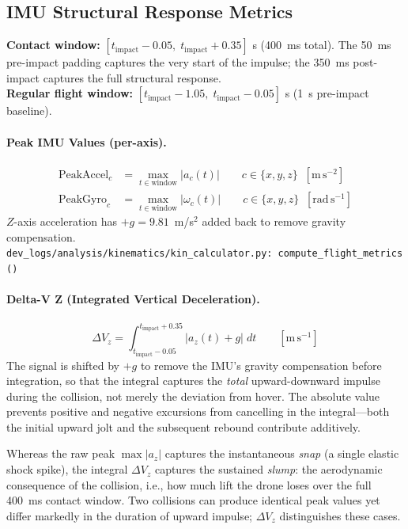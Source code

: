 \subsection{IMU Structural Response Metrics}

\textbf{Contact window:} $[t_{\text{impact}} - 0.05,\; t_{\text{impact}} + 0.35]$ s (400~ms total). The 50~ms pre-impact padding captures the very start of the impulse; the 350~ms post-impact captures the full structural response.\\
\textbf{Regular flight window:} $[t_{\text{impact}} - 1.05,\; t_{\text{impact}} - 0.05]$ s (1~s pre-impact baseline).

\medskip
\paragraph{Peak IMU Values (per-axis).}
\begin{align}
    \mathrm{PeakAccel}_c &= \max_{t \in \text{window}} |a_c(t)| \qquad c \in \{x, y, z\} \;\;[\mathrm{m\,s^{-2}}] \\
    \mathrm{PeakGyro}_c  &= \max_{t \in \text{window}} |\omega_c(t)| \qquad c \in \{x, y, z\} \;\;[\mathrm{rad\,s^{-1}}]
\end{align}
$Z$-axis acceleration has $+g = 9.81$~m/s$^2$ added back to remove gravity compensation.\\
\texttt{\small dev\_logs/analysis/kinematics/kin\_calculator.py:\ compute\_flight\_metrics()}

\medskip
\paragraph{Delta-V Z (Integrated Vertical Deceleration).}
\begin{equation}
    \Delta V_z = \int_{t_{\text{impact}}-0.05}^{t_{\text{impact}}+0.35} |a_z(t) + g| \; dt \qquad [\mathrm{m\,s^{-1}}]
\end{equation}
The signal is shifted by $+g$ to remove the IMU's gravity compensation before integration, so that the integral captures the \emph{total} upward-downward impulse during the collision, not merely the deviation from hover. The absolute value prevents positive and negative excursions from cancelling in the integral---both the initial upward jolt and the subsequent rebound contribute additively.

Whereas the raw peak $\max|a_z|$ captures the instantaneous \emph{snap} (a single elastic shock spike), the integral $\Delta V_z$ captures the sustained \emph{slump}: the aerodynamic consequence of the collision, i.e., how much lift the drone loses over the full 400~ms contact window. Two collisions can produce identical peak values yet differ markedly in the duration of upward impulse; $\Delta V_z$ distinguishes these cases.

